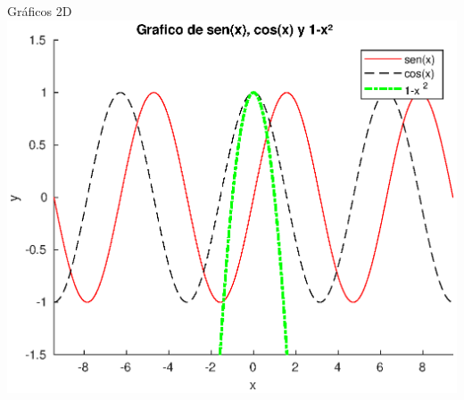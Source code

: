 \documentclass[8pt]{extarticle}
\begin{document}
\begin{multicols}{3}
        \begin{exampleBlock}{Gr\'aficos 2D}
            \quad\\

            \includegraphics[width=\textwidth]{plots/plotting.eps}
        \end{exampleBlock}



    \end{multicols}




    \newpage


    \vspace*{0.5cm}
\end{document}
